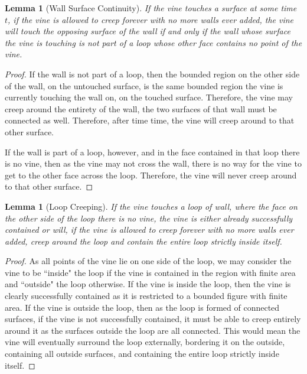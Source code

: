 \documentclass[12pt]{article}
\theoremstyle{plain}
\newtheorem{lemma}[theorem]{Lemma}
\theoremstyle{definition}
\begin{document}
\begin{lemma}[Wall Surface Continuity]
\label{lma:wall-surface-cont}
If the vine touches a surface at some time \(t\), if the vine is allowed to creep forever with no more walls ever added, the vine will touch the opposing surface of the wall if and only if the wall whose surface the vine is touching is not part of a loop whose other face contains no point of the vine. 
\end{lemma}
\begin{proof}[Proof]
If the wall is not part of a loop, then the bounded region on the other side of the wall, on the untouched surface, is the same bounded region the vine is currently touching the wall on, on the touched surface. Therefore, the vine may creep around the entirety of the wall, the two surfaces of that wall must be connected as well. Therefore, after time time, the vine will creep around to that other surface.

If the wall is part of a loop, however, and in the face contained in that loop there is no vine, then as the vine may not cross the wall, there is no way for the vine to get to the other face across the loop. Therefore, the vine will never creep around to that other surface.
\end{proof}


\begin{lemma}[Loop Creeping]
\label{lma:loop-creeping}
If the vine touches a loop of wall, where the face on the other side of the loop there is no vine, the vine is either already successfully contained or will, if the vine is allowed to creep forever with no more walls ever added, creep around the loop and contain the entire loop strictly inside itself.
\end{lemma}
\begin{proof}[Proof]
As all points of the vine lie on one side of the loop, we may consider the vine to be ``inside" the loop if the vine is contained in the region with finite area and ``outside" the loop otherwise. If the vine is inside the loop, then the vine is clearly successfully contained as it is restricted to a bounded figure with finite area. If the vine is outside the loop, then as the loop is formed of connected surfaces, if the vine is not successfully contained, it must be able to creep entirely around it as the surfaces outside the loop are all connected. This would mean the vine will eventually surround the loop externally, bordering it on the outside, containing all outside surfaces, and containing the entire loop strictly inside itself.
\end{proof}
\end{document}

